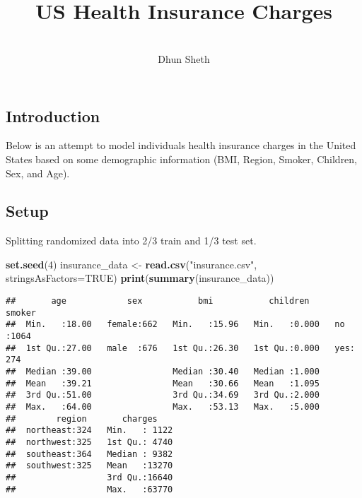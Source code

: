 \documentclass[
]{article}
\title{\\
US Health Insurance Charges\\}
\author{\strut \\
Dhun Sheth\\}
\date{\strut \\
2023-12-19\\}
\newenvironment{Shaded}{\begin{snugshade}}{\end{snugshade}}
\newcommand{\AttributeTok}[1]{\textcolor[rgb]{0.13,0.29,0.53}{#1}}
\newcommand{\ConstantTok}[1]{\textcolor[rgb]{0.56,0.35,0.01}{#1}}
\newcommand{\DecValTok}[1]{\textcolor[rgb]{0.00,0.00,0.81}{#1}}
\newcommand{\FunctionTok}[1]{\textcolor[rgb]{0.13,0.29,0.53}{\textbf{#1}}}
\newcommand{\NormalTok}[1]{#1}
\newcommand{\OtherTok}[1]{\textcolor[rgb]{0.56,0.35,0.01}{#1}}
\newcommand{\StringTok}[1]{\textcolor[rgb]{0.31,0.60,0.02}{#1}}
\begin{document}
\maketitle

\hypertarget{introduction}{%
\subsection{Introduction}\label{introduction}}

Below is an attempt to model individuals health insurance charges in the
United States based on some demographic information (BMI, Region,
Smoker, Children, Sex, and Age).

\hypertarget{setup}{%
\subsection{Setup}\label{setup}}

Splitting randomized data into 2/3 train and 1/3 test set.

\begin{Shaded}
\begin{Highlighting}[]
\FunctionTok{set.seed}\NormalTok{(}\DecValTok{4}\NormalTok{)}
\NormalTok{insurance\_data }\OtherTok{\textless{}{-}} \FunctionTok{read.csv}\NormalTok{(}\StringTok{"insurance.csv"}\NormalTok{, }\AttributeTok{stringsAsFactors=}\ConstantTok{TRUE}\NormalTok{)}
\FunctionTok{print}\NormalTok{(}\FunctionTok{summary}\NormalTok{(insurance\_data))}
\end{Highlighting}
\end{Shaded}

\begin{verbatim}
##       age            sex           bmi           children     smoker    
##  Min.   :18.00   female:662   Min.   :15.96   Min.   :0.000   no :1064  
##  1st Qu.:27.00   male  :676   1st Qu.:26.30   1st Qu.:0.000   yes: 274  
##  Median :39.00                Median :30.40   Median :1.000             
##  Mean   :39.21                Mean   :30.66   Mean   :1.095             
##  3rd Qu.:51.00                3rd Qu.:34.69   3rd Qu.:2.000             
##  Max.   :64.00                Max.   :53.13   Max.   :5.000             
##        region       charges     
##  northeast:324   Min.   : 1122  
##  northwest:325   1st Qu.: 4740  
##  southeast:364   Median : 9382  
##  southwest:325   Mean   :13270  
##                  3rd Qu.:16640  
##                  Max.   :63770
\end{verbatim}
\end{document}
